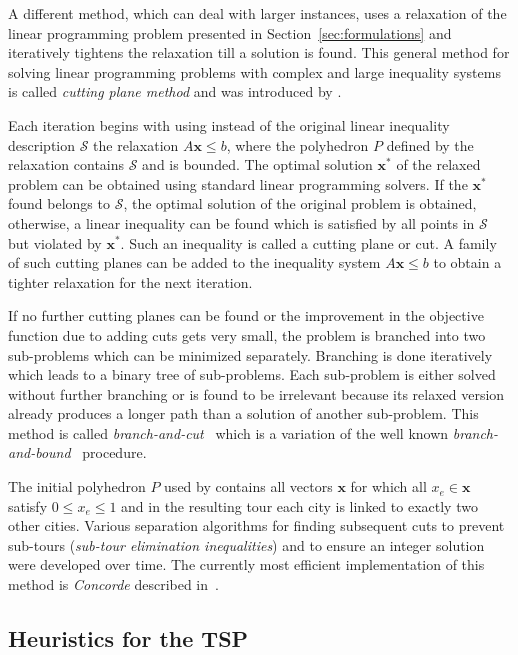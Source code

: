 \documentclass[10pt,a4paper,fleqn]{article}
\begin{document}
A different method, which can deal with larger instances, uses a relaxation of
the linear programming problem presented in Section~\ref{sec:formulations} and
iteratively tightens the relaxation till a solution is found. This general
method for solving linear programming problems with complex and large
inequality systems is called \emph{cutting plane method} and was introduced by
\cite{Dantzig1954}. 

Each iteration begins with using instead of the original linear
inequality description $\mathcal{S}$ the relaxation $A\mathbf{x} \le b$,
where the polyhedron $P$ defined by the relaxation contains
$\mathcal{S}$ and is bounded.  The optimal solution $\mathbf{x}^*$ of
the relaxed problem can be obtained using standard linear programming
solvers. If the $\mathbf{x}^*$ found belongs to $\mathcal{S}$, the
optimal solution of the original problem is obtained, otherwise, a
linear inequality can be found which is satisfied by all points in
$\mathcal{S}$ but violated by $\mathbf{x}^*$.  Such an inequality is
called a cutting plane or cut.  A family of such cutting planes can be
added to the inequality system $A\mathbf{x} \le b$ to obtain a tighter
relaxation for the next iteration.

If no further cutting planes can be found or the improvement in the
objective function due to adding cuts gets very small, the problem is
branched into two sub-problems which can be minimized
separately. Branching is done iteratively which leads to a binary tree
of sub-problems. Each sub-problem is either solved without further
branching or is found to be irrelevant because its relaxed version
already produces a longer path than a solution of another sub-problem.
This method is called \emph{branch-and-cut}~\citep{Padberg1990} which is
a variation of the well known \emph{branch-and-bound}~\citep{Land1960}
procedure.

The initial polyhedron $P$ used by \cite{Dantzig1954} contains all
vectors $\mathbf{x}$ for which all $x_e \in \mathbf{x}$ satisfy $0 \le
x_e \le 1$ and in the resulting tour each city is linked to exactly two
other cities.  Various separation algorithms for finding subsequent cuts
to prevent sub-tours (\emph{sub-tour elimination inequalities}) and to
ensure an integer solution \citep[\emph{Gomory cuts;}][]{Gomory1963}
were developed over time. The currently most efficient implementation of
this method is \emph{Concorde} described in~\cite{Applegate2000}.

\subsection{Heuristics for the TSP}\label{sec:heuristics}
\end{document}
